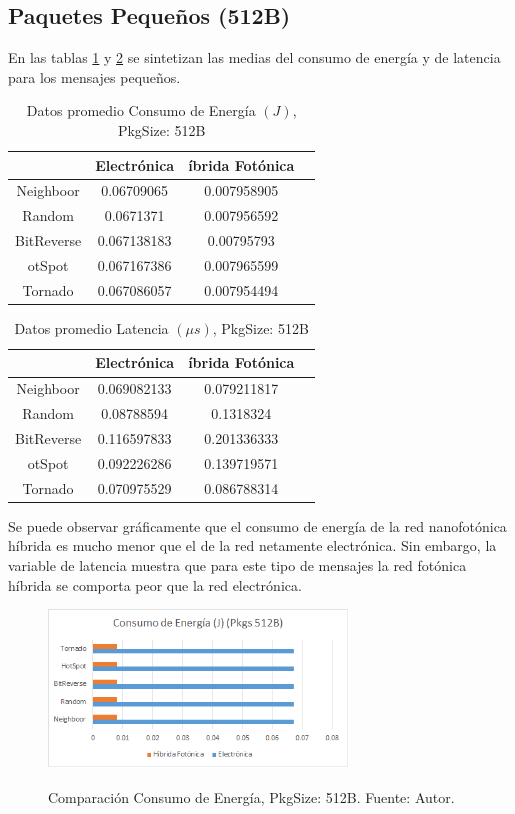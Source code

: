 \documentclass{IEEEtran}
\begin{document}
\subsection{Paquetes Pequeños (512B)}

En las tablas \ref{tb:eall512} y \ref{tb:lall512} se sintetizan 
las medias del consumo de energía y de
latencia para los mensajes pequeños.

\begin{table}[]
\centering
\begin{tabular}{|c|c|c|c|}
\hline
&Electrónica&íbrida Fotónica\\
\hline
Neighboor&0.06709065&0.007958905\\
Random&0.0671371&0.007956592\\
BitReverse&0.067138183&0.00795793\\
otSpot&0.067167386&0.007965599\\
Tornado&0.067086057&0.007954494\\
\hline
\end{tabular}
\caption{Datos promedio Consumo de Energía $(J)$, PkgSize: 512B}
\label{tb:eall512}
\end{table}


\begin{table}[]
\centering
\begin{tabular}{|c|c|c|c|}
\hline
&Electrónica&íbrida Fotónica\\
\hline
Neighboor&0.069082133&0.079211817\\
Random&0.08788594&0.1318324\\
BitReverse&0.116597833&0.201336333\\
otSpot&0.092226286&0.139719571\\
Tornado&0.070975529&0.086788314\\
\hline
\end{tabular}
\caption{Datos promedio Latencia $(\mu s)$, PkgSize: 512B}
\label{tb:lall512}
\end{table}

Se puede observar gráficamente que el consumo de energía de la red
nanofotónica híbrida es mucho menor que el de la red netamente electrónica.
Sin embargo, la variable de latencia muestra que para este tipo de mensajes
la red fotónica híbrida se comporta peor que la red electrónica.

\begin{figure}[]
\caption{Comparación Consumo de Energía, PkgSize: 512B. Fuente: Autor.}
\centering
\includegraphics[width=8cm,natwidth=483,natheight=256]{figs/E512.png}
\label{fig:e512}
\end{figure} 
\end{document}
